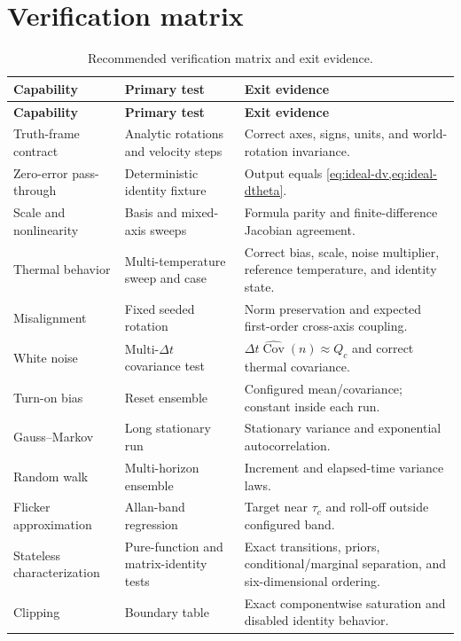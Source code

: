 \documentclass[11pt,oneside,headings=big]{scrreprt}
\newcommand{\Cov}{\operatorname{Cov}}
\begin{document}
    \section{Verification matrix}
    \begin{longtable}{@{}L{1.45in}L{2.05in}L{2.75in}@{}}
        \caption{Recommended verification matrix and exit evidence.}
        \label{tab:verification-matrix}\\
        \toprule
        \textbf{Capability} & \textbf{Primary test} & \textbf{Exit evidence} \\
        \midrule
        \endfirsthead
        \toprule
        \textbf{Capability} & \textbf{Primary test} & \textbf{Exit evidence} \\
        \midrule
        \endhead
        Truth-frame contract & Analytic rotations and velocity steps & Correct axes, signs, units, and world-rotation invariance. \\
        Zero-error pass-through & Deterministic identity fixture & Output equals \cref{eq:ideal-dv,eq:ideal-dtheta}. \\
        Scale and nonlinearity & Basis and mixed-axis sweeps & Formula parity and finite-difference Jacobian agreement. \\
        Thermal behavior & Multi-temperature sweep and  case & Correct bias, scale, noise multiplier, reference temperature, and identity state. \\
        Misalignment & Fixed seeded rotation & Norm preservation and expected first-order cross-axis coupling. \\
        White noise & Multi-$\Delta t$ covariance test & $\Delta t\widehat{\Cov}(n)\approx Q_c$ and correct thermal covariance. \\
        Turn-on bias & Reset ensemble & Configured mean/covariance; constant inside each run. \\
        Gauss--Markov & Long stationary run & Stationary variance and exponential autocorrelation. \\
        Random walk & Multi-horizon ensemble & Increment and elapsed-time variance laws. \\
        Flicker approximation & Allan-band regression & Target near $\tau_c$ and roll-off outside configured band. \\
        Stateless characterization & Pure-function and matrix-identity tests & Exact transitions, priors, conditional/marginal separation, and six-dimensional ordering. \\
        Clipping & Boundary table & Exact componentwise saturation and disabled identity behavior. \\

\end{longtable}
\end{document}
